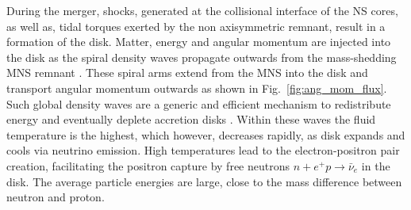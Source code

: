 During the merger, shocks, generated at the collisional interface of the \ac{NS} cores,
as well as, tidal torques exerted by the non axisymmetric remnant, result in a formation
of the disk. Matter, energy and angular momentum are injected into the disk as the spiral 
density waves propagate outwards from the mass-shedding \ac{MNS} remnant 
\citep{Bernuzzi:2015opx,Radice:2018xqa}.
%
These spiral arms extend from the \ac{MNS} into the disk and transport angular 
momentum outwards as shown in Fig.~\ref{fig:ang_mom_flux}. Such global density waves are 
a generic and efficient mechanism to redistribute energy and eventually deplete  
accretion disks \citep{Goodman:2001a,Rafikov:2016a,Arzamasskiy:2018a}. 
%
Within these waves the fluid temperature is the highest, which however, decreases rapidly, as 
disk expands and cools via neutrino emission.
High temperatures lead to the electron-positron pair creation, 
facilitating the positron capture by free neutrons $n+e^+p\rightarrow\bar{\nu}_e$ in the disk.
%
The average particle energies are large, close to the mass difference between neutron 
and proton. 
